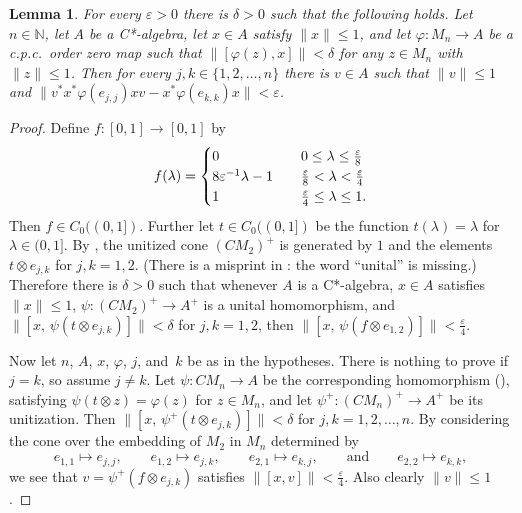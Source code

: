 \documentclass[11pt]{amsart}
\theoremstyle{plain}
\newtheorem{lemma}[theorem]{Lemma}
\theoremstyle{definition}
\theoremstyle{remark}
\numberwithin{equation}{section}
\newcommand{\N}{\mathbb{N}}
\newcommand{\dt}{\delta}
\newcommand{\ep}{\varepsilon}
\newcommand{\ld}{\lambda}
\newcommand{\ph}{\varphi}
\newcommand{\ps}{\psi}
\newcommand{\andeqn}{\qquad {\mbox{and}} \qquad}
\begin{document}
\begin{lemma}\label{L_8808_CommEqEst}
For every $\ep > 0$ there is $\dt > 0$ such that the following holds.
Let $n \in \N$,
let $A$ be a C*-algebra,
let $x \in A$ satisfy $\| x \| \leq 1$,
and let $\varphi \colon M_{n} \to A$ be a c.p.c.~order zero map
such that
$\| [\varphi (z), x] \| < \dt$
for any $z \in M_{n}$ with $\| z \| \leq 1$.
Then for every $j, k \in \{ 1, 2, \ldots, n \}$
there is $v \in A$ such that $\| v \| \leq 1$
and
$\bigl\| v^* x^* \ph (e_{j, j}) x v - x^* \ph (e_{k, k}) x \bigr\|
 < \ep$.
\end{lemma}

\begin{proof}
Define $f \colon [0, 1] \to [0, 1]$ by
\[
f (\ld)
 = \begin{cases}
   0                            &
                   \hspace*{1em} 0 \leq \ld \leq \frac{\ep}{8}
        \\
   8 \ep^{-1} \ld - 1           &
                   \hspace*{1em} \frac{\ep}{8} < \ld < \frac{\ep}{4}
       \\
   1                            &
                   \hspace*{1em} \frac{\ep}{4} \leq \ld \leq 1.
\end{cases}
\]
Then $f \in C_0 ( (0, 1] )$.
Further let $t \in C_0 ( (0, 1] )$ be the function
$t (\ld) = \ld$ for $\ld \in (0, 1]$.
By \cite[Lemma 2.5]{ABP16},
the unitized cone $(C M_2)^{+}$
is generated by $1$ and the elements
$t \otimes e_{j, k}$ for $j, k = 1, 2$.
(There is a misprint in \cite[Lemma 2.5]{ABP16}:
the word ``unital'' is missing.)
Therefore there is $\dt > 0$ such that whenever $A$ is a C*-algebra,
$x \in A$ satisfies $\| x \| \leq 1$,
$\ps \colon (C M_2)^{+} \to A^{+}$
is a unital homomorphism,
and $\| [x, \, \ps ( t \otimes e_{j, k} ) ] \| < \dt$
for $j, k = 1, 2$,
then
$\| [x, \, \ps ( f \otimes e_{1, 2} ) ] \| < \frac{\ep}{4}$.

Now let $n$, $A$, $x$, $\ph$, $j$, and~$k$ be as in the hypotheses.
There is nothing to prove if $j = k$,
so assume $j \neq k$.
Let $\ps \colon C M_n \to A$ be the corresponding homomorphism
(\cite[Corollary~4.1]{WZ09}),
satisfying $\ps (t \otimes z) = \ph (z)$ for $z \in M_n$,
and let $\ps^{+} \colon (C M_n)^{+} \to A^{+}$ be its unitization.
Then
$\| [x, \, \ps^{+} ( t \otimes e_{j, k} ) ] \| < \dt$
for $j, k = 1, 2, \ldots, n$.
By considering the cone over the embedding of $M_2$ in $M_n$
determined by
\[
e_{1, 1} \mapsto e_{j, j},
\qquad
e_{1, 2} \mapsto e_{j, k},
\qquad
e_{2, 1} \mapsto e_{k, j},
\andeqn
e_{2, 2} \mapsto e_{k, k},
\]
we see that $v = \ps^{+} ( f \otimes e_{j, k} )$
satisfies
$\| [x, v] \| < \frac{\ep}{4}$.
Also clearly $\| v \| \leq 1$.


\end{proof}
\end{document}
